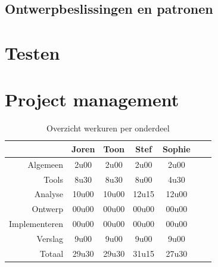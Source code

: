 \documentclass[i1]{oss}
\begin{document}
\subsection{Ontwerpbeslissingen en patronen}
\label{ssec:Ontwerpbeslissingen}



\section{Testen}
\label{ssec:testen}


\section{Project management}
\label{ssec:Projectmanag}


\begin{table}[h!]
\begin{center}
    \begin{tabular}{ r | c  c  c  c  c  c}
     & Joren & Toon & Stef & Sophie \\ \hline
    Algemeen & 2u00 & 2u00 & 2u00 & 2u00\\
           Tools & 8u30 & 8u30 & 8u00 & 4u30 \\
        Analyse & 10u00 & 10u00 & 12u15 & 12u00 \\
        Ontwerp & 00u00 & 00u00 & 00u00 & 00u00 \\
        Implementeren & 00u00 & 00u00 & 00u00 & 00u00\\
        Verslag & 9u00 & 9u00 & 9u00 & 9u00 \\
        Totaal & 29u30 & 29u30 & 31u15 & 27u30  
    \end{tabular}
    \caption{Overzicht werkuren per onderdeel}
    \label{tab:werkuren}
\end{center}
\end{table}
\end{document}

